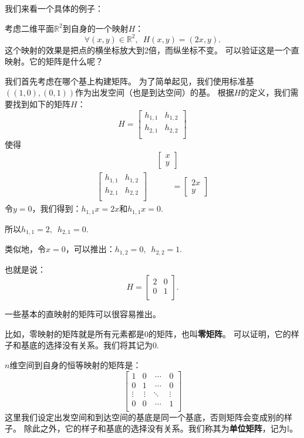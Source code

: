 \documentclass[12pt,UTF8]{ctexbook}
\begin{document}
我们来看一个具体的例子：

考虑二维平面$\mathbb{R}^2$到自身的一个映射$H$：
$$ \forall (x, y) \in \mathbb{R}^2, \,\,\, H(x,y) = (2x, y).$$
这个映射的效果是把点的横坐标放大到2倍，而纵坐标不变。
可以验证这是一个直映射。它的矩阵是什么呢？

我们首先考虑在哪个基上构建矩阵。
为了简单起见，我们使用标准基$\left((1,0),(0,1)\right)$作为出发空间（也是到达空间）的基。
根据$H$的定义，我们需要找到如下的矩阵$H$：
$$
H = \begin{bmatrix}
    h_{1,1} & h_{1,2}  \\
    h_{2,1} & h_{2,2}  \\
  \end{bmatrix}
$$
使得
\begin{align*}
&  \,\begin{bmatrix}x\\y\end{bmatrix}  \\
    \begin{bmatrix}
         h_{1,1} & h_{1,2}  \\
         h_{2,1} & h_{2,2}  \\
       \end{bmatrix} \,&\qquad = \begin{bmatrix}2x\\y \end{bmatrix} 
\end{align*}
令$y = 0$，我们得到：$h_{1,1}x = 2x$和$h_{1,1}x = 0$.

所以$h_{1,1} = 2, \,\,\, h_{2,1} = 0.$

类似地，令$x = 0$，可以推出：$h_{1,2} = 0, \,\,\, h_{2,2} = 1.$

也就是说：
$$
H = \begin{bmatrix}
    2 & 0  \\
    0 & 1  \\
  \end{bmatrix}.
$$

一些基本的直映射的矩阵可以很容易推出。

比如，零映射的矩阵就是所有元素都是$0$的矩阵，也叫\textbf{零矩阵}。
可以证明，它的样子和基底的选择没有关系。我们将其记为$0$.

$n$维空间到自身的恒等映射的矩阵是：
$$
\begin{bmatrix}
 1     & 0  & \,\cdots \, & 0 \\
 0     & 1  & \,\cdots \,& 0 \\
 \vdots      & \,\vdots  \,  & \ddots & \vdots  \\
 0     & 0   & \,\cdots \,& 1 \\
\end{bmatrix}
$$
这里我们设定出发空间和到达空间的基底是同一个基底，否则矩阵会变成别的样子。
除此之外，它的样子和基底的选择没有关系。我们称其为\textbf{单位矩阵}，记为$\mathbb{I}$。
\end{document}
